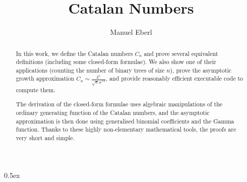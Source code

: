 \documentclass[11pt,a4paper]{article}
\begin{document}
\title{Catalan Numbers}
\author{Manuel Eberl}
\maketitle

\begin{abstract}
In this work, we define the Catalan numbers $C_n$ and prove several equivalent definitions (including some closed-form formulae). We also show one of their applications (counting the number of binary trees of size $n$), prove the asymptotic growth approximation $C_n \sim \frac{4^n}{\sqrt{\pi}n^{1.5}}$, and provide reasonably efficient executable code to compute them.

The derivation of the closed-form formulae uses algebraic manipulations of the ordinary generating function of the Catalan numbers, and the asymptotic approximation is then done using generalised binomial coefficients and the Gamma function. Thanks to these highly non-elementary mathematical tools, the proofs are very short and simple.
\end{abstract}

\tableofcontents

\parindent 0pt\parskip 0.5ex

\newpage




\end{document}
